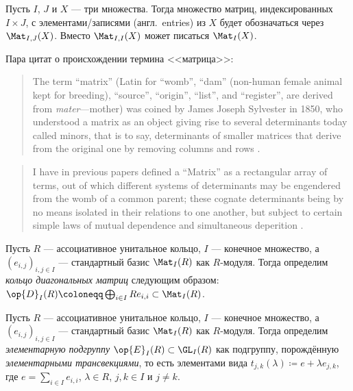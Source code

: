 \documentclass[
	extrafontsizes,
	11pt,
	hyphens,
]{memoir}
\begin{document}
\begin{notation}
Пусть \(I\), \(J\) и \(X\) --- три множества.
Тогда множество матриц, индексированных \(I \times J\), с элементами/записями (англ.\ \textenglish{entries}) из \(X\) будет обозначаться через \(\Mat_{I,J}(X)\).
Вместо \(\Mat_{I,I}(X)\) может писаться \(\Mat_I(X)\).
\end{notation}

\begin{remark}
Пара цитат о происхождении термина <<матрица>>:
\begin{quote}
\textenglish{The term ``matrix'' (Latin for ``womb'', ``dam'' (non-human female animal kept for breeding), ``source'', ``origin'', ``list'', and ``register'', are derived from \emph{mater}---mother) was coined by James Joseph Sylvester in 1850, who understood a matrix as an object giving rise to several determinants today called minors, that is to say, determinants of smaller matrices that derive from the original one by removing columns and rows \cite{wiki_matrix_history}.}
\end{quote}
\begin{quote}
\textenglish{I have in previous papers defined a ``Matrix'' as a rectangular array of terms, out of which different systems of determinants may be engendered from the womb of a common parent; these cognate determinants being by no means isolated in their relations to one another, but subject to certain simple laws of mutual dependence and simultaneous deperition \autocite[247]{sylvester_1851}.}
\end{quote}
\end{remark}

\begin{definition}
Пусть \(R\) --- ассоциативное унитальное кольцо, \(I\) --- конечное множество, а \((e_{i,j})_{i,j \in I}\) --- стандартный базис \(\Mat_I(R)\) как \(R\)-мо\-ду\-ля.
Тогда определим \emph{кольцо диагональных матриц} следующим образом: \(\op{D}_I(R) \coloneqq \bigoplus_{i \in I} R e_{i,i} \subset \Mat_I(R)\).
\end{definition}

\begin{definition}
Пусть \(R\) --- ассоциативное унитальное кольцо, \(I\) --- конечное множество, а \((e_{i,j})_{i,j \in I}\) --- стандартный базис \(\Mat_I(R)\) как \(R\)-мо\-ду\-ля.
Тогда определим \emph{элементарную подгруппу} \(\op{E}_I(R) \subset \GL_I(R)\) как подгруппу, порождённую \emph{элементарными трансвекциями}, то есть элементами вида \(t_{j,k}(\lambda) \coloneqq e + \lambda e_{j,k}\), где \(e = \sum_{i \in I} e_{i,i}\), \(\lambda \in R\), \(j,k \in I\) и \(j \neq k\).
\end{definition}
\end{document}
